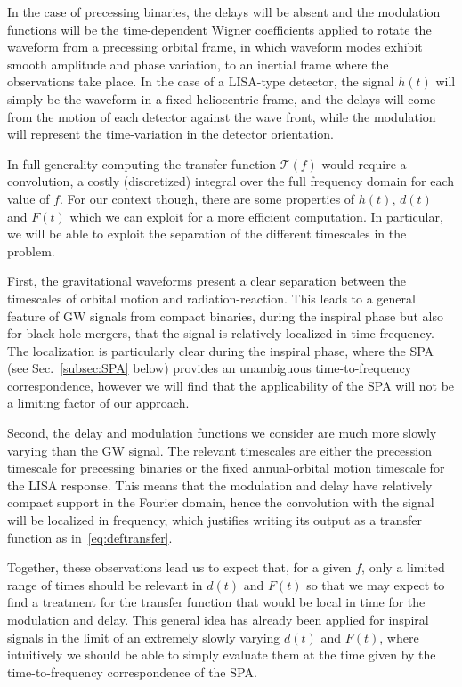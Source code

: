 \documentclass[aps,showpacs,twocolumn,
prd,superscriptaddress,nofootinbib]{revtex4-1}
\newcommand\calT{{\mathcal{T}}}
\begin{document}
In the case of precessing binaries, the delays will be absent and the modulation functions will be the time-dependent Wigner coefficients applied to rotate the waveform from a precessing orbital frame, in which waveform modes exhibit smooth amplitude and phase variation, to an inertial frame where the observations take place. In the case of a LISA-type detector, the signal $h(t)$ will simply be the waveform in a fixed heliocentric frame, and the delays will come from the motion of each detector against the wave front, while the modulation will represent the time-variation in the detector orientation.

In full generality computing the transfer function $\calT(f)$ would require a convolution, a costly (discretized) integral over the full frequency domain for each value of $f$. For our context though, there are some properties of $h(t)$, $d(t)$ and $F(t)$ which we can exploit for a more efficient computation. In particular, we will be able to exploit the separation of the different timescales in the problem.

First, the gravitational waveforms present a clear separation between the timescales of orbital motion and radiation-reaction. This leads to a general feature of GW signals from compact binaries, during the inspiral phase but also for black hole mergers, that the signal is relatively localized in time-frequency. The localization is particularly clear during the inspiral phase, where the SPA (see Sec.~\ref{subsec:SPA} below) provides an unambiguous time-to-frequency correspondence, however we will find that the applicability of the SPA will not be a limiting factor of our approach.

Second, the delay and modulation functions we consider are much more slowly varying than the GW signal. The relevant timescales are either the precession timescale for precessing binaries or the fixed annual-orbital motion timescale for the LISA response. This means that the modulation and delay have relatively compact support in the Fourier domain, hence the convolution with the signal will be localized in frequency, which justifies writing its output as a transfer function as in~\eqref{eq:deftransfer}.

Together, these observations lead us to expect that, for a given $f$, only a limited range of times should be relevant in $d(t)$ and $F(t)$ so that we may expect to find a treatment for the transfer function that would be local in time for the modulation and delay. This general idea has already been applied for inspiral signals in the limit of an extremely slowly varying $d(t)$ and $F(t)$, where intuitively we should be able to simply evaluate them at the time given by the time-to-frequency correspondence of the SPA.
\end{document}
